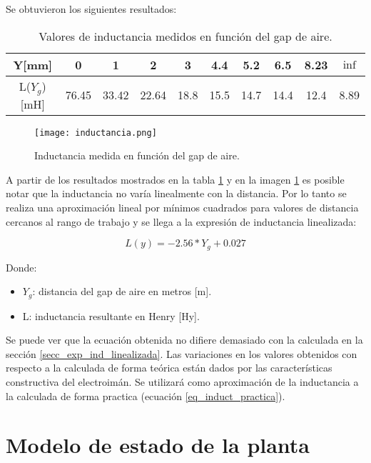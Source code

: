 \noindent Se obtuvieron los siguientes resultados:

\begin{table} [H]
	\begin{center}
		\begin{tabular}{| c | c | c | c | c | c | c | c | c | c |}
			\hline			
			Y[mm] & 0 & 1 & 2 & 3 & 4.4 & 5.2 & 6.5 & 8.23 & $\inf$ \\ \hline
			L($Y_g$)[mH] & 76.45 & 33.42 & 22.64 & 18.8 & 15.5 & 14.7 & 14.4 & 12.4 & 8.89\\ \hline
		\end{tabular}
		\caption{Valores de inductancia medidos en función del gap de aire.}
		\label{tab_mediciones_inductancia}
	\end{center}
\end{table}

\begin{figure} [H]
	\centering
	\texttt{[image: inductancia.png]}
	\caption{Inductancia medida en función del gap de aire.}
	\label{fig:img_inductancia_medida}
\end{figure}
\noindent A partir de los resultados mostrados en la tabla \ref{tab_mediciones_inductancia} y en la imagen \ref{fig:img_inductancia_medida} es posible notar que la inductancia no varía linealmente con la distancia. Por lo tanto se realiza una aproximación lineal por mínimos cuadrados para valores de distancia cercanos al rango de trabajo y se llega a la expresión de inductancia linealizada:

\begin{equation}
	\label{eq_induct_practica}
	L(y)=-2.56*Y_{g}+0.027
\end{equation}

\noindent Donde:
\begin{itemize}
	\item $Y_{g}$: distancia del gap de aire en metros [m].
	\item L: inductancia resultante en Henry [Hy].
\end{itemize}

\noindent Se puede ver que la ecuación obtenida no  difiere demasiado con la calculada en la sección \ref{secc_exp_ind_linealizada}. Las variaciones en los valores obtenidos con respecto a la calculada de forma teórica están dados por las características constructiva del electroimán. Se utilizará como aproximación de la inductancia a la calculada de forma practica (ecuación \ref{eq_induct_practica}).

\section{Modelo de estado de la planta}

